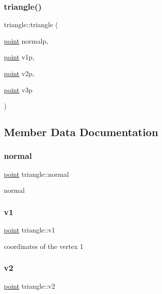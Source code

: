 \subsubsection{\texorpdfstring{triangle()}{triangle()}}
{\footnotesize\ttfamily triangle\+::triangle (\begin{DoxyParamCaption}\item[{\mbox{\hyperlink{structpoint}{point}}}]{normalp,  }\item[{\mbox{\hyperlink{structpoint}{point}}}]{v1p,  }\item[{\mbox{\hyperlink{structpoint}{point}}}]{v2p,  }\item[{\mbox{\hyperlink{structpoint}{point}}}]{v3p }\end{DoxyParamCaption})\hspace{0.3cm}{\ttfamily [inline]}}



\subsection{Member Data Documentation}
\mbox{\label{structtriangle_a99c2fc091345b37cb9d068a7851243d1}} 
\subsubsection{\texorpdfstring{normal}{normal}}
{\footnotesize\ttfamily \mbox{\hyperlink{structpoint}{point}} triangle\+::normal}

normal \mbox{\label{structtriangle_a1f178f3ffddf2f1ff8258007641bb2d8}} 
\subsubsection{\texorpdfstring{v1}{v1}}
{\footnotesize\ttfamily \mbox{\hyperlink{structpoint}{point}} triangle\+::v1}

coordinates of the vertex 1 \mbox{\label{structtriangle_a95fa7738b13194d20216d0086c534fec}} 
\subsubsection{\texorpdfstring{v2}{v2}}
{\footnotesize\ttfamily \mbox{\hyperlink{structpoint}{point}} triangle\+::v2}

